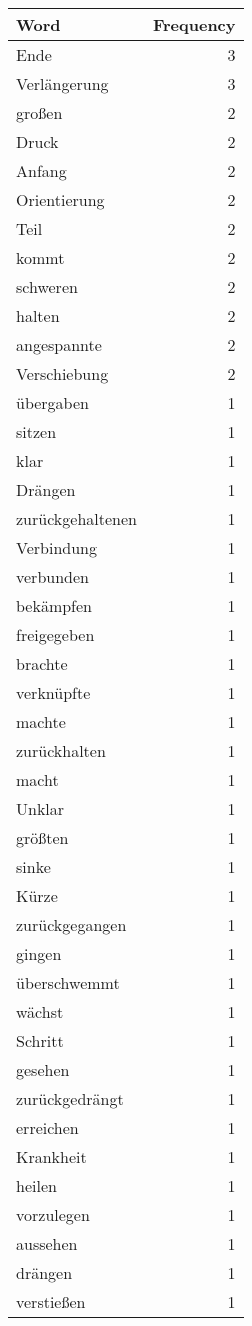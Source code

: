 \begin{tabular}{lr}
\toprule
Word & Frequency \\
\midrule
Ende & 3 \\
Verlängerung & 3 \\
großen & 2 \\
Druck & 2 \\
Anfang & 2 \\
Orientierung & 2 \\
Teil & 2 \\
kommt & 2 \\
schweren & 2 \\
halten & 2 \\
angespannte & 2 \\
Verschiebung & 2 \\
übergaben & 1 \\
sitzen & 1 \\
klar & 1 \\
Drängen & 1 \\
zurückgehaltenen & 1 \\
Verbindung & 1 \\
verbunden & 1 \\
bekämpfen & 1 \\
freigegeben & 1 \\
brachte & 1 \\
verknüpfte & 1 \\
machte & 1 \\
zurückhalten & 1 \\
macht & 1 \\
Unklar & 1 \\
größten & 1 \\
sinke & 1 \\
Kürze & 1 \\
zurückgegangen & 1 \\
gingen & 1 \\
überschwemmt & 1 \\
wächst & 1 \\
Schritt & 1 \\
gesehen & 1 \\
zurückgedrängt & 1 \\
erreichen & 1 \\
Krankheit & 1 \\
heilen & 1 \\
vorzulegen & 1 \\
aussehen & 1 \\
drängen & 1 \\
verstießen & 1 \\

\end{tabular}
